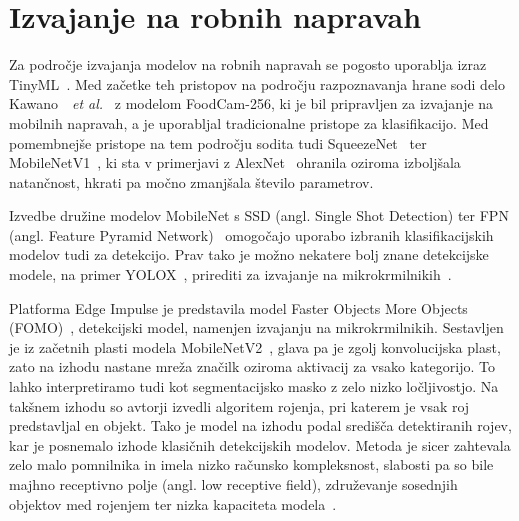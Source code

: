 \documentclass[a4paper,twoside,openright,12pt,slovene]{book}
\newcommand{\etal}{\textit{et al.}} %
\begin{document}
    \section{Izvajanje na robnih napravah} \label{sct:izvajanje-na-robnih-napravah}

        Za področje izvajanja modelov na robnih napravah se pogosto uporablja
        izraz TinyML~\cite{src:abadade2023comprehensive}. Med začetke teh
        pristopov na področju razpoznavanja hrane sodi delo
        Kawano~~\etal~\cite{src:kawano2014foodcam} z modelom FoodCam-256, ki je
        bil pripravljen za izvajanje na mobilnih napravah, a je uporabljal
        tradicionalne pristope za klasifikacijo. Med pomembnejše pristope na
        tem področju sodita tudi SqueezeNet~\cite{src:iandola2016squeezenet}
        ter MobileNetV1~\cite{src:howard2017mobilenets}, ki sta v primerjavi z
        AlexNet~\cite{src:krizhevsky2012imagenet} ohranila oziroma izboljšala
        natančnost, hkrati pa močno zmanjšala število parametrov.

        Izvedbe družine modelov MobileNet s SSD (angl. Single Shot Detection)
        ter FPN (angl. Feature Pyramid Network)~\cite{src:lin2017feature}
        omogočajo uporabo izbranih klasifikacijskih modelov tudi za detekcijo.
        Prav tako je možno nekatere bolj znane detekcijske modele, na primer
        YOLOX~\cite{src:ge2021yolox}, prirediti za izvajanje na
        mikrokrmilnikih~\cite{src:stm32modelzoo}.

        Platforma Edge Impulse je predstavila model Faster Objects More Objects
        (FOMO)~\cite{src:fomodocs}, detekcijski model, namenjen izvajanju na
        mikrokrmilnikih. Sestavljen je iz začetnih plasti modela
        MobileNetV2~\cite{src:sandler2018mobilenetv2}, glava pa je zgolj
        konvolucijska plast, zato na izhodu nastane mreža značilk oziroma aktivacij za
        vsako kategorijo. To lahko interpretiramo tudi kot segmentacijsko masko
        z zelo nizko ločljivostjo. Na takšnem izhodu so avtorji izvedli algoritem
        rojenja, pri katerem je vsak roj predstavljal en objekt. Tako je model na izhodu podal središča
        detektiranih rojev, kar je posnemalo izhode klasičnih
        detekcijskih modelov. Metoda je sicer zahtevala zelo malo pomnilnika in
        imela nizko računsko kompleksnost, slabosti pa so bile majhno
        receptivno polje (angl. low receptive field), združevanje sosednjih
        objektov med rojenjem ter nizka kapaciteta
        modela~\cite{src:boyle2024dsort}.
 
\end{document}
